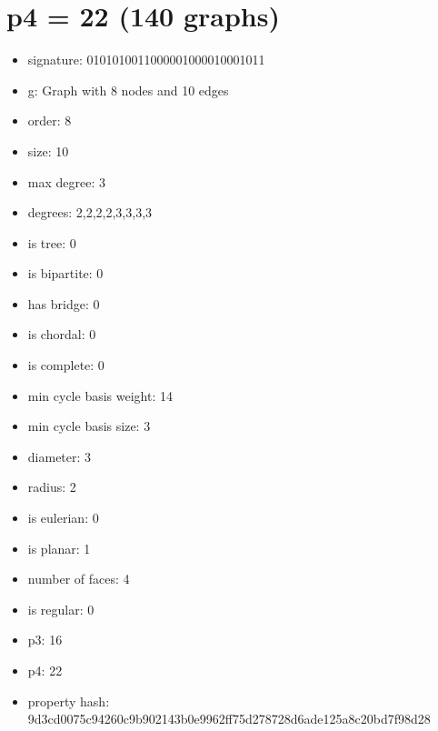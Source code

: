 \chapter{p4 = 22 (140 graphs)}
\newpage\begin{figure}
\end{figure}
\begin{itemize}
\item signature: 0101010011000001000010001011
\item g: Graph with 8 nodes and 10 edges
\item order: 8
\item size: 10
\item max degree: 3
\item degrees: 2,2,2,2,3,3,3,3
\item is tree: 0
\item is bipartite: 0
\item has bridge: 0
\item is chordal: 0
\item is complete: 0
\item min cycle basis weight: 14
\item min cycle basis size: 3
\item diameter: 3
\item radius: 2
\item is eulerian: 0
\item is planar: 1
\item number of faces: 4
\item is regular: 0
\item p3: 16
\item p4: 22
\item property hash: 9d3cd0075c94260c9b902143b0e9962ff75d278728d6ade125a8c20bd7f98d28
\end{itemize}
